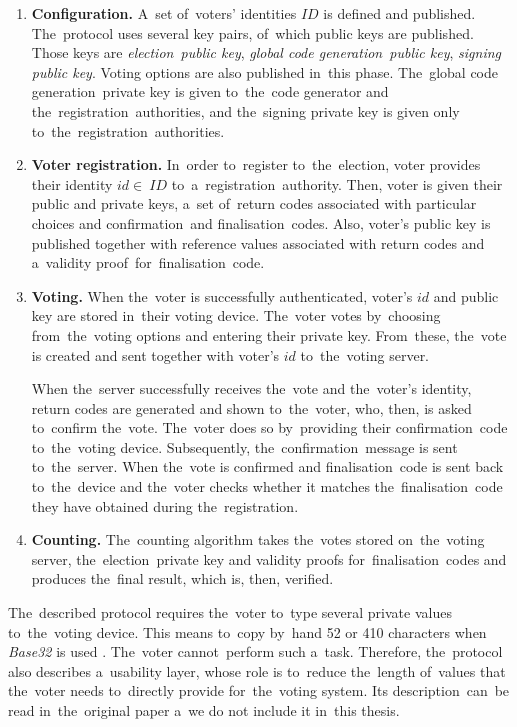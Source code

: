 \begin{enumerate}
\item \textbf{Configuration.} A~set of~voters' identities $ID$ is defined and published. The~protocol uses several key pairs, of~which public keys are published. Those keys are \emph{election~public key}, \emph{ global code generation~public key}, \emph{signing public key}. Voting options are also published in~this phase. The~global code generation~private key is given to~the~code generator and the~registration~authorities, and the~signing private key is given only to~the~registration~authorities.
\item \textbf{Voter registration.} In~order to~register to~the~election, voter provides their identity $id \in~ID$ to~a~registration~authority. Then, voter is given their public and private keys, a~set of~return codes associated with particular choices and confirmation~and finalisation~codes. Also, voter's public key is published together with reference values associated with return codes and a~validity proof~for~finalisation~code.
\item{ \textbf{Voting.} When the~voter is successfully authenticated, voter's $id$ and public key are stored in~their voting device. The~voter votes by~choosing from~the~voting options and entering their private key. From~these, the~vote is created and sent together with voter's $id$ to~the~voting server. 

When the~server successfully receives the~vote and the~voter's identity, return codes are generated and shown to~the~voter, who, then, is asked to~confirm the~vote. The~voter does so by~providing their confirmation~code to~the~voting device. Subsequently, the~confirmation~message is sent to~the~server. When the~vote is confirmed and finalisation~code is sent back to~the~device and the~voter checks whether it matches the~finalisation~code they have obtained during the~registration.}
\item \textbf{Counting.} The~counting algorithm takes the~votes stored on~the~voting server, the~election~private key and validity proofs for~finalisation~codes and produces the~final result, which is, then, verified.
\end{enumerate}

The~described protocol requires the~voter to~type several private values to~the~voting device. This means to~copy by~hand 52 or 410 characters when \emph{Base32} is used \cite{Swiss}. The~voter cannot~perform such a~task. Therefore, the~protocol also describes a~usability layer, whose role is to~reduce the~length of~values that the~voter needs to~directly provide for~the~voting system. Its description~can~be read in~the~original paper a~we do not include it in~this thesis.



